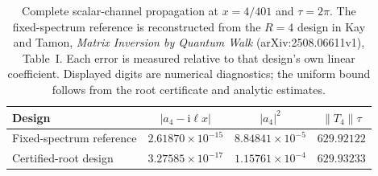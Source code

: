 \begin{table}[htbp]
\centering
\small
\begin{tabular}{lccc}
\toprule
Design & $|a_4-\mathrm{i}\ell x|$ & $|a_4|^2$ & $\|T_4\|\tau$ \\
\midrule
Fixed-spectrum reference & $2.61870\times10^{-15}$ & $8.84841\times10^{-5}$ & $629.92122$ \\
Certified-root design & $3.27585\times10^{-17}$ & $1.15761\times10^{-4}$ & $629.93233$ \\
\bottomrule
\end{tabular}
\caption{Complete scalar-channel propagation at $x=4/401$ and $\tau=2\pi$.
The fixed-spectrum reference is reconstructed from the $R=4$ design in
Kay and Tamon, \emph{Matrix Inversion by Quantum Walk}
(arXiv:2508.06611v1), Table~I. Each error is measured relative to that
design's own linear coefficient. Displayed digits are numerical diagnostics;
the uniform bound follows from the root certificate and analytic estimates.}
\label{tab:comparison}
\end{table}
